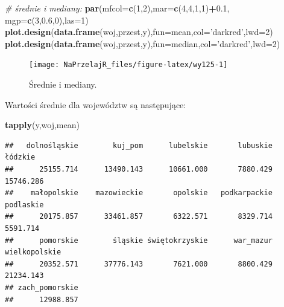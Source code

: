 \documentclass[polish,]{book}
\newenvironment{Shaded}{\begin{snugshade}}{\end{snugshade}}
\newcommand{\CommentTok}[1]{\textcolor[rgb]{0.56,0.35,0.01}{\textit{#1}}}
\newcommand{\DataTypeTok}[1]{\textcolor[rgb]{0.13,0.29,0.53}{#1}}
\newcommand{\DecValTok}[1]{\textcolor[rgb]{0.00,0.00,0.81}{#1}}
\newcommand{\FloatTok}[1]{\textcolor[rgb]{0.00,0.00,0.81}{#1}}
\newcommand{\KeywordTok}[1]{\textcolor[rgb]{0.13,0.29,0.53}{\textbf{#1}}}
\newcommand{\NormalTok}[1]{#1}
\newcommand{\OperatorTok}[1]{\textcolor[rgb]{0.81,0.36,0.00}{\textbf{#1}}}
\newcommand{\StringTok}[1]{\textcolor[rgb]{0.31,0.60,0.02}{#1}}
\begin{document}
\begin{Shaded}
\begin{Highlighting}[]
\CommentTok{# średnie i mediany:}
\KeywordTok{par}\NormalTok{(}\DataTypeTok{mfcol=}\KeywordTok{c}\NormalTok{(}\DecValTok{1}\NormalTok{,}\DecValTok{2}\NormalTok{),}\DataTypeTok{mar=}\KeywordTok{c}\NormalTok{(}\DecValTok{4}\NormalTok{,}\DecValTok{4}\NormalTok{,}\DecValTok{1}\NormalTok{,}\DecValTok{1}\NormalTok{)}\OperatorTok{+}\FloatTok{0.1}\NormalTok{, }\DataTypeTok{mgp=}\KeywordTok{c}\NormalTok{(}\DecValTok{3}\NormalTok{,}\FloatTok{0.6}\NormalTok{,}\DecValTok{0}\NormalTok{),}\DataTypeTok{las=}\DecValTok{1}\NormalTok{)}
\KeywordTok{plot.design}\NormalTok{(}\KeywordTok{data.frame}\NormalTok{(woj,przest,y),}\DataTypeTok{fun=}\NormalTok{mean,}\DataTypeTok{col=}\StringTok{'darkred'}\NormalTok{,}\DataTypeTok{lwd=}\DecValTok{2}\NormalTok{)}
\KeywordTok{plot.design}\NormalTok{(}\KeywordTok{data.frame}\NormalTok{(woj,przest,y),}\DataTypeTok{fun=}\NormalTok{median,}\DataTypeTok{col=}\StringTok{'darkred'}\NormalTok{,}\DataTypeTok{lwd=}\DecValTok{2}\NormalTok{)}
\end{Highlighting}
\end{Shaded}

\begin{figure}[h]

{\centering \texttt{[image: NaPrzelajR\_files/figure-latex/wy125-1]} 

}

\caption{Średnie i mediany.}\label{fig:wy125}
\end{figure}

Wartości średnie dla województw są następujące:

\begin{Shaded}
\begin{Highlighting}[]
\KeywordTok{tapply}\NormalTok{(y,woj,mean)}
\end{Highlighting}
\end{Shaded}

\begin{verbatim}
##   dolnośląskie        kuj_pom      lubelskie       lubuskie        łódzkie 
##      25155.714      13490.143      10661.000       7880.429      15746.286 
##    małopolskie    mazowieckie       opolskie   podkarpackie      podlaskie 
##      20175.857      33461.857       6322.571       8329.714       5591.714 
##      pomorskie        śląskie świętokrzyskie      war_mazur  wielkopolskie 
##      20352.571      37776.143       7621.000       8800.429      21234.143 
## zach_pomorskie 
##      12988.857
\end{verbatim}
\end{document}
